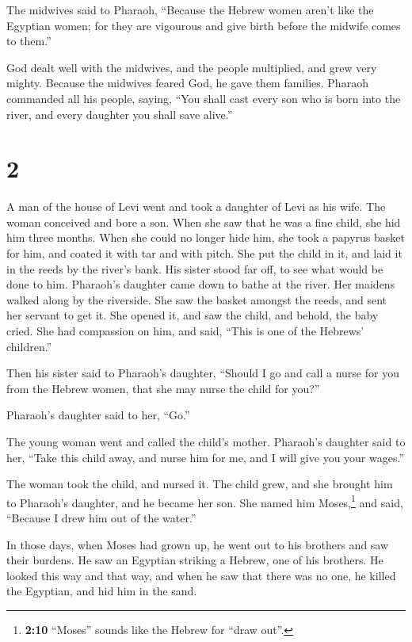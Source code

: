  The midwives said to Pharaoh, ``Because the Hebrew women
aren't like the Egyptian women; for they are vigourous and give birth
before the midwife comes to them.''

 God dealt well with the midwives, and the people
multiplied, and grew very mighty.  Because the midwives
feared God, he gave them families.  Pharaoh commanded all
his people, saying, ``You shall cast every son who is born into the
river, and every daughter you shall save alive.''

\hypertarget{section-1}{%
\section{2}\label{section-1}}

 A man of the house of Levi went and took a daughter of
Levi as his wife.  The woman conceived and bore a son.
When she saw that he was a fine child, she hid him three months.
 When she could no longer hide him, she took a papyrus
basket for him, and coated it with tar and with pitch. She put the child
in it, and laid it in the reeds by the river's bank.  His
sister stood far off, to see what would be done to him. 
Pharaoh's daughter came down to bathe at the river. Her maidens walked
along by the riverside. She saw the basket amongst the reeds, and sent
her servant to get it.  She opened it, and saw the child,
and behold, the baby cried. She had compassion on him, and said, ``This
is one of the Hebrews' children.''

 Then his sister said to Pharaoh's daughter, ``Should I go
and call a nurse for you from the Hebrew women, that she may nurse the
child for you?''

 Pharaoh's daughter said to her, ``Go.''

The young woman went and called the child's mother. 
Pharaoh's daughter said to her, ``Take this child away, and nurse him
for me, and I will give you your wages.''

The woman took the child, and nursed it.  The child grew,
and she brought him to Pharaoh's daughter, and he became her son. She
named him Moses,\footnote{\textbf{2:10} ``Moses'' sounds like the Hebrew
  for ``draw out''.} and said, ``Because I drew him out of the water.''

 In those days, when Moses had grown up, he went out to
his brothers and saw their burdens. He saw an Egyptian striking a
Hebrew, one of his brothers.  He looked this way and that
way, and when he saw that there was no one, he killed the Egyptian, and
hid him in the sand.

